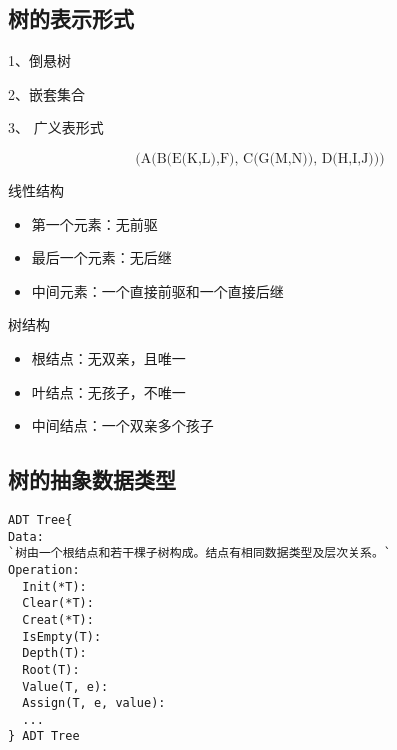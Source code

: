 \subsection{树的表示形式}
\begin{frame}
1、倒悬树
\begin{figure}
\centering
    
\end{figure}

\end{frame}
%
\begin{frame}
2、嵌套集合

\begin{figure}
\centering
    
\end{figure}

\end{frame}
%
\begin{frame}
3、 广义表形式

$$
\mbox{(A(B(E(K,L),F), C(G(M,N)), D(H,I,J)))}
$$
\end{frame}
%
\begin{frame}
\textcolor{acolor5}{线性结构}
\begin{itemize}
\item 第一个元素：无前驱
\item 最后一个元素：无后继
\item 中间元素：一个直接前驱和一个直接后继
\end{itemize}
 
\textcolor{acolor5}{树结构}
\begin{itemize}
\item 根结点：无双亲，且唯一
\item 叶结点：无孩子，不唯一
\item 中间结点：一个双亲多个孩子
\end{itemize}
\end{frame}

\subsection{树的抽象数据类型}
\begin{frame}[fragile]
\begin{lstlisting}[basicstyle=\ttfamily\footnotesize]
ADT Tree{
Data:
`树由一个根结点和若干棵子树构成。结点有相同数据类型及层次关系。`
Operation:
  Init(*T): 
  Clear(*T):
  Creat(*T):  
  IsEmpty(T):
  Depth(T):
  Root(T):
  Value(T, e):
  Assign(T, e, value):
  ...
} ADT Tree
\end{lstlisting}
\end{frame}
